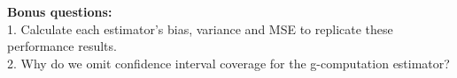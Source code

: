 \documentclass[answers]{exam}
\begin{document}
\noindent\textbf{Bonus questions:} \\
1. Calculate each estimator's bias, variance and MSE to replicate these performance results. \\
2. Why do we omit confidence interval coverage for the g-computation estimator? \\
\end{document}
